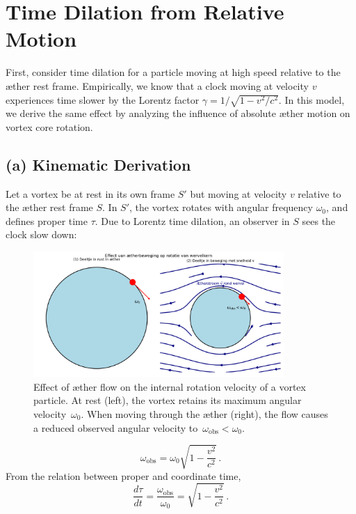 
\section{Time Dilation from Relative Motion}

First, consider time dilation for a particle moving at high speed relative to the æther rest frame. Empirically, we know that a clock moving at velocity $v$ experiences time slower by the Lorentz factor $\gamma = 1/\sqrt{1 - v^2/c^2}$. In this model, we derive the same effect by analyzing the influence of absolute æther motion on vortex core rotation.

\subsection*{(a) Kinematic Derivation}

Let a vortex be at rest in its own frame $S'$ but moving at velocity $v$ relative to the æther rest frame $S$. In $S'$, the vortex rotates with angular frequency $\omega_0$, and defines proper time $\tau$. Due to Lorentz time dilation, an observer in $S$ sees the clock slow down:

\begin{figure}[htbp]
    \centering
    \includegraphics[width=0.85\textwidth]{06-TijdsdilatatieBeweging}
    \caption{Effect of æther flow on the internal rotation velocity of a vortex particle. At rest (left), the vortex retains its maximum angular velocity~$\omega_0$. When moving through the æther (right), the flow causes a reduced observed angular velocity to~$\omega_{\mathrm{obs}} < \omega_0$.}
    \label{fig:TijdsdilatatieBeweging}
\end{figure}

\[
\omega_{\text{obs}} = \omega_0 \sqrt{1 - \frac{v^2}{c^2}} \,.
\]
From the relation between proper and coordinate time,
\[
\frac{d\tau}{dt} = \frac{\omega_{\text{obs}}}{\omega_0} = \sqrt{1 - \frac{v^2}{c^2}} \,. \tag{2}
\]

